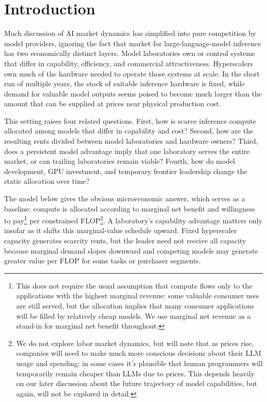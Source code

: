 \documentclass[11pt]{article}
\begin{document}
\section{Introduction}
\label{sec:introduction}

Much discussion of AI market dynamics has simplified into pure competition by model providers, ignoring the fact that market for large-language-model inference has two economically distinct layers. Model laboratories own or control systems that differ in capability, efficiency, and commercial attractiveness. Hyperscalers own much of the hardware needed to operate those systems at scale. In the short run of multiple years, the stock of suitable inference hardware is fixed, while demand for valuable model outputs seems poised to become much larger than the amount that can be supplied at prices near physical production cost.

This setting raises four related questions. First, how is scarce inference compute allocated among models that differ in capability and cost? Second, how are the resulting rents divided between model laboratories and hardware owners? Third, does a persistent model advantage imply that one laboratory serves the entire market, or can trailing laboratories remain viable? Fourth, how do model development, GPU investment, and temporary frontier leadership change the static allocation over time?

The model below gives the obvious microeconomic answer, which serves as a baseline; compute is allocated according to marginal net benefit and willingness to pay\footnote{This does not require the usual assumption that compute flows only to the applications with the highest marginal revenue: some valuable consumer uses are still served, but the allocation implies that many consumer applications will be filled by relatively cheap models. We use marginal net revenue as a stand-in for marginal net benefit throughout.} per constrained FLOP\footnote{We do not explore labor market dynamics, but will note that as prices rise, companies will need to make much more conscious decisions about their LLM usage and spending; in some cases it's plausible that human programmers will temporarily remain cheaper than LLMs due to prices. This depends heavily on our later discussion about the future trajectory of model capabilities, but again, will not be explored in detail.}. A laboratory's capability advantage matters only insofar as it shifts this marginal-value schedule upward. Fixed hyperscaler capacity generates scarcity rents, but the leader need not receive all capacity because marginal demand slopes downward and competing models may generate greater value per FLOP for some tasks or purchaser segments.
\end{document}

